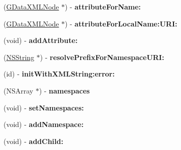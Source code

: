 \begin{DoxyCompactItemize}
\item 
\hypertarget{interface_g_data_x_m_l_element_a0823c7ce613abf40d5913805cbf54a8e}{
(\hyperlink{interface_g_data_x_m_l_node}{GDataXMLNode} $\ast$) -\/ {\bfseries attributeForName:}}
\label{interface_g_data_x_m_l_element_a0823c7ce613abf40d5913805cbf54a8e}

\item 
\hypertarget{interface_g_data_x_m_l_element_aa685fc8bb2453aa2af8543eaa3ac27bc}{
(\hyperlink{interface_g_data_x_m_l_node}{GDataXMLNode} $\ast$) -\/ {\bfseries attributeForLocalName:URI:}}
\label{interface_g_data_x_m_l_element_aa685fc8bb2453aa2af8543eaa3ac27bc}

\item 
\hypertarget{interface_g_data_x_m_l_element_a51a2307fd7086c0e814fd7b3d5da86bf}{
(void) -\/ {\bfseries addAttribute:}}
\label{interface_g_data_x_m_l_element_a51a2307fd7086c0e814fd7b3d5da86bf}

\item 
\hypertarget{interface_g_data_x_m_l_element_ab27be508b932cbe3d0686659069e41b7}{
(\hyperlink{class_n_s_string}{NSString} $\ast$) -\/ {\bfseries resolvePrefixForNamespaceURI:}}
\label{interface_g_data_x_m_l_element_ab27be508b932cbe3d0686659069e41b7}

\item 
\hypertarget{interface_g_data_x_m_l_element_a8020a4dae6ad3175527534d5a793e285}{
(id) -\/ {\bfseries initWithXMLString:error:}}
\label{interface_g_data_x_m_l_element_a8020a4dae6ad3175527534d5a793e285}

\item 
\hypertarget{interface_g_data_x_m_l_element_a4c0f13082cdf1115dd51a1199a6c8935}{
(NSArray $\ast$) -\/ {\bfseries namespaces}}
\label{interface_g_data_x_m_l_element_a4c0f13082cdf1115dd51a1199a6c8935}

\item 
\hypertarget{interface_g_data_x_m_l_element_af725206ae3ce5c7855a1a2960e82fef7}{
(void) -\/ {\bfseries setNamespaces:}}
\label{interface_g_data_x_m_l_element_af725206ae3ce5c7855a1a2960e82fef7}

\item 
\hypertarget{interface_g_data_x_m_l_element_a58f2f9b4dbc512caa8b0a6ac42e907a1}{
(void) -\/ {\bfseries addNamespace:}}
\label{interface_g_data_x_m_l_element_a58f2f9b4dbc512caa8b0a6ac42e907a1}

\item 
\hypertarget{interface_g_data_x_m_l_element_a506a65646d411876d1d23b1ce0afa920}{
(void) -\/ {\bfseries addChild:}}
\label{interface_g_data_x_m_l_element_a506a65646d411876d1d23b1ce0afa920}


\end{DoxyCompactItemize}
